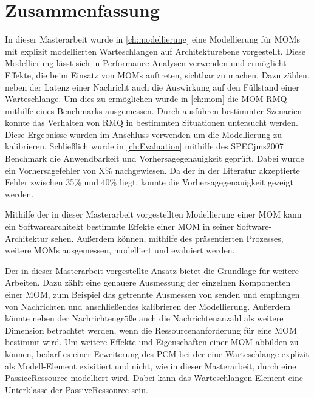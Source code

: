 
\chapter{Zusammenfassung}
\label{ch:zusammenfassung}
In dieser Masterarbeit wurde in \autoref{ch:modellierung} eine Modellierung für MOMs mit explizit modellierten Warteschlangen auf Architekturebene vorgestellt. Diese Modellierung lässt sich in Performance-Analysen verwenden und ermöglicht Effekte, die beim Einsatz von MOMs auftreten, sichtbar zu machen. Dazu zählen, neben der Latenz einer Nachricht auch die Auswirkung auf den Füllstand einer Warteschlange. Um dies zu ermöglichen wurde in \autoref{ch:mom} die MOM RMQ mithilfe eines Benchmarks ausgemessen. Durch ausführen bestimmter Szenarien konnte das Verhalten von RMQ in bestimmten Situationen untersucht werden. Diese Ergebnisse wurden im Anschluss verwenden um die Modellierung zu kalibrieren. Schließlich wurde in \autoref{ch:Evaluation} mithilfe des SPECjms2007 Benchmark die Anwendbarkeit und Vorhersagegenauigkeit geprüft. Dabei wurde ein Vorhersagefehler von X\% nachgewiesen. Da der in der Literatur akzeptierte Fehler zwischen 35\% und 40\% \cite{error} liegt, konnte die Vorhersagegenauigkeit gezeigt werden. \par
Mithilfe der in dieser Masterarbeit vorgestellten Modellierung einer MOM kann ein Softwarearchitekt bestimmte Effekte einer MOM in seiner Software-Architektur sehen. Außerdem können, mithilfe des präsentierten Prozesses, weitere MOMs ausgemessen, modelliert und evaluiert werden.  \par
Der in dieser Masterarbeit vorgestellte Ansatz bietet die Grundlage für weitere Arbeiten. Dazu zählt eine genauere Ausmessung der einzelnen Komponenten einer MOM, zum Beispiel das getrennte Ausmessen von senden und empfangen von Nachrichten und anschließendes kalibrieren der Modellierung. Außerdem könnte neben der Nachrichtengröße auch die Nachrichtenanzahl als weitere Dimension betrachtet werden, wenn die Ressourcenanforderung für eine MOM bestimmt wird. Um weitere Effekte und Eigenschaften einer MOM abbilden zu können, bedarf es einer Erweiterung des PCM bei der eine Warteschlange explizit als Modell-Element exisitiert und nicht, wie in dieser Masterarbeit, durch eine PassiceRessource modelliert wird. Dabei kann das Warteschlangen-Element eine Unterklasse der PassiveRessource sein. 